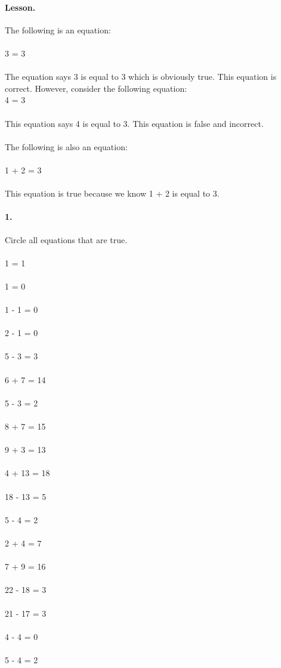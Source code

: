 \documentclass[12pt]{article}
\begin{document}
\paragraph{Lesson.}
The following is an equation: \\
\\
3 = 3 \\
\\
The equation says 3 is equal to 3 which is obviously true. This equation is correct. However, consider the following equation: \\
4 = 3 \\
\\
This equation says 4 is equal to 3. This equation is false and incorrect.
\\
\\
The following is also an equation: \\
\\
1 + 2 = 3 \\
\\
This equation is true because we know 1 + 2 is equal to 3.

\newpage

\paragraph{1.} 
Circle all equations that are true. \\
\\
1 = 1
\\
\\
1 = 0
\\
\\
1 - 1 = 0
\\
\\
2 - 1 = 0
\\
\\
5 - 3 = 3
\\
\\
6 + 7 = 14
\\
\\
5 - 3 = 2
\\
\\
8 + 7 = 15
\\
\\
9 + 3 = 13
\\
\\
4 + 13 = 18
\\
\\
18 - 13 = 5
\\
\\
5 - 4 = 2
\\
\\
2 + 4 = 7
\\
\\
7 + 9 = 16
\\
\\
22 - 18 = 3
\\
\\
21 - 17 = 3
\\
\\
4 - 4 = 0
\\
\\
5 - 4 = 2
\end{document}
